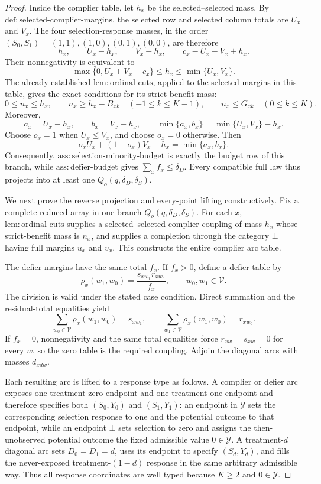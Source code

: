 \documentclass{article}
\begin{document}
\begin{proof}
Inside the complier table, let \(h_x\) be the selected--selected mass.  By \(\mathrm{def:selected\text{-}complier\text{-}margins}\), the selected row and selected column totals are \(U_x\) and \(V_x\).  The four selection-response masses, in the order \((S_0,S_1)=(1,1),(1,0),(0,1),(0,0)\), are therefore
\[
 h_x,
 \qquad U_x-h_x,
 \qquad V_x-h_x,
 \qquad c_x-U_x-V_x+h_x.
\]
Their nonnegativity is equivalent to
\[
 \max\{0,U_x+V_x-c_x\}
 \leq h_x\leq\min\{U_x,V_x\}.
\]
The already established \(\mathrm{lem:ordinal\text{-}cuts}\), applied to the selected margins in this table, gives the exact conditions for its strict-benefit mass:
\[
 0\leq n_x\leq h_x,
 \qquad
 n_x\geq h_x-B_{xk}\quad(-1\leq k\leq K-1),
 \qquad
 n_x\leq G_{xk}\quad(0\leq k\leq K).
\]
Moreover,
\[
 a_x=U_x-h_x,
 \qquad
 b_x=V_x-h_x,
 \qquad
 \min\{a_x,b_x\}=\min\{U_x,V_x\}-h_x.
\]
Choose \(o_x=1\) when \(U_x\leq V_x\), and choose \(o_x=0\) otherwise.  Then
\[
 o_xU_x+(1-o_x)V_x-h_x=\min\{a_x,b_x\}.
\]
Consequently, \(\mathrm{ass:selection\text{-}minority\text{-}budget}\) is exactly the budget row of this branch, while \(\mathrm{ass:defier\text{-}budget}\) gives \(\sum_x f_x\leq\delta_D\).  Every compatible full law thus projects into at least one \(Q_o(q,\delta_D,\delta_S)\).

We next prove the reverse projection and every-point lifting constructively.  Fix a complete reduced array in one branch \(Q_o(q,\delta_D,\delta_S)\).  For each \(x\), \(\mathrm{lem:ordinal\text{-}cuts}\) supplies a selected--selected complier coupling of mass \(h_x\) whose strict-benefit mass is \(n_x\), and supplies a completion through the category \(\bot\) having full margins \(u_x\) and \(v_x\).  This constructs the entire complier arc table.

The defier margins have the same total \(f_x\).  If \(f_x>0\), define a defier table by
\[
 \rho_x(w_1,w_0)=\frac{s_{xw_1}r_{xw_0}}{f_x},
 \qquad w_0,w_1\in\mathcal V.
\]
The division is valid under the stated case condition.  Direct summation and the residual-total equalities yield
\[
 \sum_{w_0\in\mathcal V}\rho_x(w_1,w_0)=s_{xw_1},
 \qquad
 \sum_{w_1\in\mathcal V}\rho_x(w_1,w_0)=r_{xw_0}.
\]
If \(f_x=0\), nonnegativity and the same total equalities force \(r_{xw}=s_{xw}=0\) for every \(w\), so the zero table is the required coupling.  Adjoin the diagonal arcs with masses \(d_{xdw}\).

Each resulting arc is lifted to a response type as follows.  A complier or defier arc exposes one treatment-zero endpoint and one treatment-one endpoint and therefore specifies both \((S_0,Y_0)\) and \((S_1,Y_1)\): an endpoint in \(\mathcal Y\) sets the corresponding selection response to one and the potential outcome to that endpoint, while an endpoint \(\bot\) sets selection to zero and assigns the then-unobserved potential outcome the fixed admissible value \(0\in\mathcal Y\).  A treatment-\(d\) diagonal arc sets \(D_0=D_1=d\), uses its endpoint to specify \((S_d,Y_d)\), and fills the never-exposed treatment-\((1-d)\) response in the same arbitrary admissible way.  Thus all response coordinates are well typed because \(K\geq2\) and \(0\in\mathcal Y\).


\end{proof}
\end{document}
